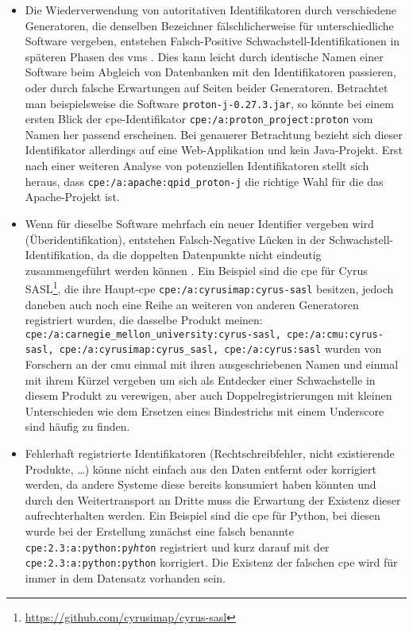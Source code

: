 \begin{itemize}
    \item Die Wiederverwendung von autoritativen Identifikatoren durch verschiedene Generatoren, die denselben Bezeichner fälschlicherweise für unterschiedliche Software vergeben, entstehen Falsch-Positive Schwachstell-Identifikationen in späteren Phasen des \acrshort{vms} \autocite{CISA2023}.
    Dies kann leicht durch identische Namen einer Software beim Abgleich von Datenbanken mit den Identifikatoren passieren, oder durch falsche Erwartungen auf Seiten beider Generatoren.
    Betrachtet man beispielsweise die Software \texttt{proton-j-0.27.3.jar}, so könnte bei einem ersten Blick der \acrshort{cpe}-Identifikator \texttt{cpe:/a:proton\_project:proton} vom Namen her passend erscheinen.
    Bei genauerer Betrachtung bezieht sich dieser Identifikator allerdings auf eine Web-Applikation und kein Java-Projekt.
    Erst nach einer weiteren Analyse von potenziellen Identifikatoren stellt sich heraus, dass \texttt{cpe:/a:apache:qpid\_proton-j} die richtige Wahl für die das Apache-Projekt ist.

    \item Wenn für dieselbe Software mehrfach ein neuer Identifier vergeben wird (Überidentifikation), entstehen Falsch-Negative Lücken in der Schwachstell-Identifikation, da die doppelten Datenpunkte nicht eindeutig zusammengeführt werden können \autocite{CISA2023}.
    Ein Beispiel sind die \acrshort{cpe} für Cyrus SASL\footnote{\url{https://github.com/cyrusimap/cyrus-sasl}}, die ihre Haupt-\acrshort{cpe} \texttt{cpe:/a:cyrusimap:cyrus-sasl} besitzen, jedoch daneben auch noch eine Reihe an weiteren von anderen Generatoren registriert wurden, die dasselbe Produkt meinen:
    \texttt{cpe:/a:carnegie\_mellon\_university:cyrus-sasl, cpe:/a:cmu:cyrus-sasl, cpe:/a:cyrusimap:cyrus\_sasl, cpe:/a:cyrus:sasl} wurden von Forschern an der \acrfull{cmu} einmal mit ihren ausgeschriebenen Namen und einmal mit ihrem Kürzel vergeben um sich als Entdecker einer Schwachstelle in diesem Produkt zu verewigen, aber auch Doppelregistrierungen mit kleinen Unterschieden wie dem Ersetzen eines Bindestrichs mit einem Underscore sind häufig zu finden.

    \item Fehlerhaft registrierte Identifikatoren (Rechtschreibfehler, nicht existierende Produkte, \ldots) könne nicht einfach aus den Daten entfernt oder korrigiert werden, da andere Systeme diese bereits konsumiert haben könnten und durch den Weitertransport an Dritte muss die Erwartung der Existenz dieser aufrechterhalten werden.
    Ein Beispiel sind die \acrshort{cpe} für Python, bei diesen wurde bei der Erstellung zunächst eine falsch benannte \texttt{cpe:2.3:a:python:py\textit{ht}on} registriert und kurz darauf mit der \texttt{cpe:2.3:a:python:python} korrigiert.
    Die Existenz der falschen \acrshort{cpe} wird für immer in dem Datensatz vorhanden sein.


\end{itemize}
